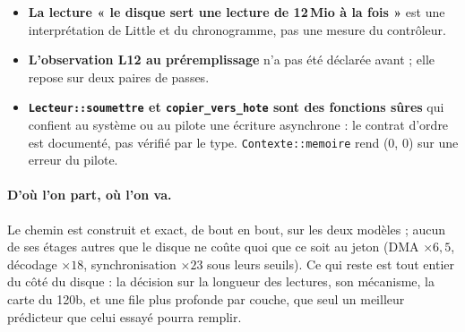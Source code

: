 \begin{faux}
\begin{itemize}
\item \textbf{La lecture « le disque sert une lecture de 12\,Mio à la fois »} est une interprétation de Little et du chronogramme, pas une mesure du contrôleur.
\item \textbf{L'observation L12 au préremplissage} n'a pas été déclarée avant ; elle repose sur deux paires de passes.
\item \textbf{\texttt{Lecteur::soumettre} et \texttt{copier\_vers\_hote} sont des fonctions sûres} qui confient au système ou au pilote une écriture asynchrone : le contrat d'ordre est documenté, pas vérifié par le type. \texttt{Contexte::memoire} rend (0, 0) sur une erreur du pilote.
\end{itemize}
\end{faux}

\paragraph{D'où l'on part, où l'on va.} Le chemin est construit et exact, de bout en bout, sur les deux modèles ; aucun de ses étages autres que le disque ne coûte quoi que ce soit au jeton (DMA $\times 6{,}5$, décodage $\times 18$, synchronisation $\times 23$ sous leurs seuils). Ce qui reste est tout entier du côté du disque : la décision sur la longueur des lectures, son mécanisme, la carte du 120b, et une file plus profonde par couche, que seul un meilleur prédicteur que celui essayé pourra remplir.
